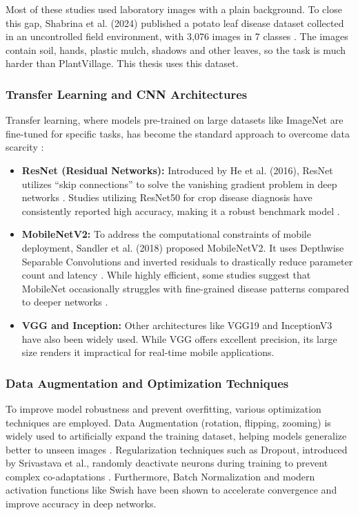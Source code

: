 Most of these studies used laboratory images with a plain background. To close this gap, Shabrina et al. (2024) published a potato leaf disease dataset collected in an uncontrolled field environment, with 3,076 images in 7 classes \cite{shabrina2024novel}. The images contain soil, hands, plastic mulch, shadows and other leaves, so the task is much harder than PlantVillage. This thesis uses this dataset.

\subsubsection{Transfer Learning and CNN Architectures}
Transfer learning, where models pre-trained on large datasets like ImageNet are fine-tuned for specific tasks, has become the standard approach to overcome data scarcity \cite{pan2010survey}:
\begin{itemize}
    \item \textbf{ResNet (Residual Networks):} Introduced by He et al. (2016), ResNet utilizes ``skip connections'' to solve the vanishing gradient problem in deep networks \cite{he2016deep}. Studies utilizing ResNet50 for crop disease diagnosis have consistently reported high accuracy, making it a robust benchmark model \cite{brahimi2017deep}.
    \item \textbf{MobileNetV2:} To address the computational constraints of mobile deployment, Sandler et al. (2018) proposed MobileNetV2. It uses Depthwise Separable Convolutions and inverted residuals to drastically reduce parameter count and latency \cite{howard2017mobilenets}. While highly efficient, some studies suggest that MobileNet occasionally struggles with fine-grained disease patterns compared to deeper networks \cite{too2019comparative}.
    \item \textbf{VGG and Inception:} Other architectures like VGG19 \cite{simonyan2015very} and InceptionV3 \cite{szegedy2015going} have also been widely used. While VGG offers excellent precision, its large size renders it impractical for real-time mobile applications.
\end{itemize}

\subsubsection{Data Augmentation and Optimization Techniques}
To improve model robustness and prevent overfitting, various optimization techniques are employed. Data Augmentation (rotation, flipping, zooming) is widely used to artificially expand the training dataset, helping models generalize better to unseen images \cite{shorten2019survey}. Regularization techniques such as Dropout, introduced by Srivastava et al., randomly deactivate neurons during training to prevent complex co-adaptations \cite{srivastava2014dropout}. Furthermore, Batch Normalization \cite{ioffe2015batch} and modern activation functions like Swish \cite{ramachandran2017swish} have been shown to accelerate convergence and improve accuracy in deep networks.

